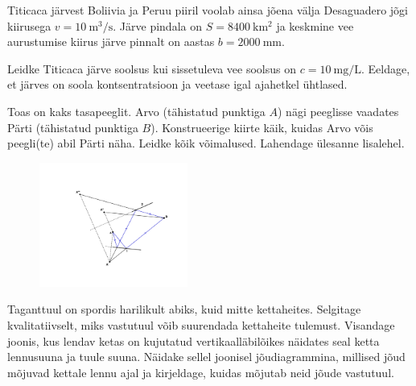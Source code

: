 \documentclass[10pt]{article}
\begin{document}

Titicaca järvest Boliivia ja Peruu piiril voolab ainsa jõena välja Desaguadero jõgi kiirusega $v=\SI{10}{\meter\cubed\per\second}$. Järve pindala on $S=\SI{8400}{\kilo\meter\squared}$ ja keskmine vee aurustumise kiirus järve pinnalt on aastas $b=\SI{2000}{\milli\meter}$. 

Leidke Titicaca järve soolsus kui sissetuleva vee soolsus on $c=\SI{10}{\milli\gram\per\liter}$. Eeldage, et järves on soola kontsentratsioon ja veetase igal ajahetkel ühtlased.
\probend
\bigskip


Toas on kaks tasapeeglit. Arvo (tähistatud punktiga $A$) nägi peeglisse vaadates Pärti (tähistatud punktiga $B$). Konstrueerige kiirte käik, kuidas Arvo võis peegli(te) abil Pärti näha. Leidke kõik võimalused. Lahendage ülesanne lisalehel.
\begin{figure}[h]
  \vspace{-1em}
  \centering
  \includegraphics[height=11em, trim=0 80 0 140, clip]{2022-v2g-01-yl.pdf}
  \vspace{-2em}
\end{figure}
\probend
\bigskip


Taganttuul on spordis harilikult abiks, kuid mitte kettaheites. Selgitage kvalitatiivselt, miks vastutuul võib suurendada kettaheite tulemust. Visandage joonis, kus lendav ketas on kujutatud vertikaalläbilõikes näidates seal ketta lennusuuna ja tuule suuna. Näidake sellel joonisel jõudiagrammina, millised jõud mõjuvad kettale lennu ajal ja kirjeldage, kuidas mõjutab neid jõude vastutuul.
\probend
\bigskip

\end{document}
